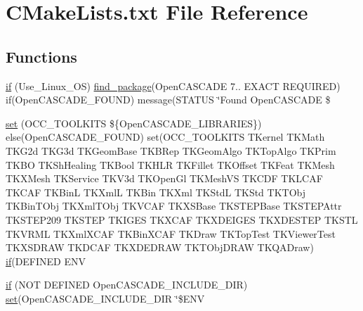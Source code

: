 \hypertarget{3rd__party_2OCC__dependency_2CMakeLists_8txt}{}\section{C\+Make\+Lists.\+txt File Reference}
\label{3rd__party_2OCC__dependency_2CMakeLists_8txt}
\subsection*{Functions}
\begin{DoxyCompactItemize}
\item 
\hyperlink{3rd__party_2OCC__dependency_2CMakeLists_8txt_ab88069ce35bff9bba68c58a7336e4df5}{if} (Use\+\_\+\+Linux\+\_\+\+OS) \hyperlink{3rd__party_2Boost__dependency_2CMakeLists_8txt_a09e553c496218f39a0eaee39ae118c6a}{find\+\_\+package}(Open\+C\+A\+S\+C\+A\+DE 7.. E\+X\+A\+CT R\+E\+Q\+U\+I\+R\+ED) if(Open\+C\+A\+S\+C\+A\+D\+E\+\_\+\+F\+O\+U\+ND) message(S\+T\+A\+T\+US \char`\"{}Found Open\+C\+A\+S\+C\+A\+DE \$
\item 
\hyperlink{3rd__party_2OCC__dependency_2CMakeLists_8txt_a074553c33956a239810d7affac62c071}{set} (O\+C\+C\+\_\+\+T\+O\+O\+L\+K\+I\+TS \$\{Open\+C\+A\+S\+C\+A\+D\+E\+\_\+\+L\+I\+B\+R\+A\+R\+I\+ES\}) else(Open\+C\+A\+S\+C\+A\+D\+E\+\_\+\+F\+O\+U\+ND) set(O\+C\+C\+\_\+\+T\+O\+O\+L\+K\+I\+TS T\+Kernel T\+K\+Math T\+K\+G2d T\+K\+G3d T\+K\+Geom\+Base T\+K\+B\+Rep T\+K\+Geom\+Algo T\+K\+Top\+Algo T\+K\+Prim T\+K\+BO T\+K\+Sh\+Healing T\+K\+Bool T\+K\+H\+LR T\+K\+Fillet T\+K\+Offset T\+K\+Feat T\+K\+Mesh T\+K\+X\+Mesh T\+K\+Service T\+K\+V3d T\+K\+Open\+Gl T\+K\+Mesh\+VS T\+K\+C\+DF T\+K\+L\+C\+AF T\+K\+C\+AF T\+K\+BinL T\+K\+XmlL T\+K\+Bin T\+K\+Xml T\+K\+StdL T\+K\+Std T\+K\+T\+Obj T\+K\+Bin\+T\+Obj T\+K\+Xml\+T\+Obj T\+K\+V\+C\+AF T\+K\+X\+S\+Base T\+K\+S\+T\+E\+P\+Base T\+K\+S\+T\+E\+P\+Attr T\+K\+S\+T\+E\+P209 T\+K\+S\+T\+EP T\+K\+I\+G\+ES T\+K\+X\+C\+AF T\+K\+X\+D\+E\+I\+G\+ES T\+K\+X\+D\+E\+S\+T\+EP T\+K\+S\+TL T\+K\+V\+R\+ML T\+K\+Xml\+X\+C\+AF T\+K\+Bin\+X\+C\+AF T\+K\+Draw T\+K\+Top\+Test T\+K\+Viewer\+Test T\+K\+X\+S\+D\+R\+AW T\+K\+D\+C\+AF T\+K\+X\+D\+E\+D\+R\+AW T\+K\+T\+Obj\+D\+R\+AW T\+K\+Q\+A\+Draw) \hyperlink{3rd__party_2OCC__dependency_2CMakeLists_8txt_a64a7251a2d6c5f84ee98be006734e24f}{if}(D\+E\+F\+I\+N\+ED E\+NV
\item 
\hyperlink{3rd__party_2OCC__dependency_2CMakeLists_8txt_a25c51c16d653bc242ca8c84c8c3f879a}{if} (N\+OT D\+E\+F\+I\+N\+ED Open\+C\+A\+S\+C\+A\+D\+E\+\_\+\+I\+N\+C\+L\+U\+D\+E\+\_\+\+D\+IR) \hyperlink{3rd__party_2OCC__dependency_2CMakeLists_8txt_a074553c33956a239810d7affac62c071}{set}(Open\+C\+A\+S\+C\+A\+D\+E\+\_\+\+I\+N\+C\+L\+U\+D\+E\+\_\+\+D\+IR \char`\"{}\$E\+NV

\end{DoxyCompactItemize}
